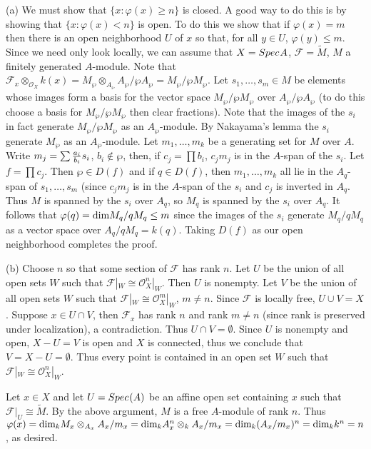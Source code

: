 \documentclass[12pt]{article}
\newcommand{\sox}{\mathcal{O}_X}
\renewcommand{\sf}{\mathcal{F}}
\newcommand{\tensor}{\otimes}
\newcommand{\isom}{\cong}
\renewcommand{\dim}{\mbox{\rm dim}}
\renewcommand{\phi}{\varphi}
\newcommand{\spec}{Spec \hspace{.01in}}
\begin{document}
(a) We must show that $\{x:\phi(x)\geq n\}$ is closed.
A good way to do this is by showing that 
$\{x:\phi(x)<n\}$ is open. To do this we show that
if $\phi(x)=m$ then there is an open neighborhood $U$ of
$x$ so that, for all $y\in U$, $\phi(y)\leq m$. 
Since we need only look locally, we can assume that
$X=\spec A$, $\sf=\tilde{M}$, $M$ a finitely generated
$A$-module. Note that $\sf_x\tensor_{\sox}k(x)=
M_{\wp}\tensor_{A_{\wp}}A_{\wp}/{\wp A_{\wp}}=
M_{\wp}/{\wp M_\wp}$.   
Let $s_1,\ldots,s_m\in M$ be elements whose images
form a basis for the vector space $M_{\wp}/\wp M_{\wp}$
over $A_{\wp}/\wp A_{\wp}$ (to do this choose a basis
for $M_{\wp}/\wp M_{\wp}$ then clear fractions). Note
that the images of the $s_i$ in fact generate
$M_{\wp}/{\wp M_{\wp}}$ as an $A_{\wp}$-module. 
By Nakayama's lemma the $s_i$ generate 
$M_{\wp}$ as an $A_{\wp}$-module. 
Let $m_1,\ldots,m_k$ be a generating set for
$M$ over $A$. Write $m_j=\sum {a_i\over b_i}s_i$,
$b_i\not\in\wp$, then, if $c_j=\prod b_i$, 
$c_jm_j$ is in the $A$-span of the $s_i$. Let
$f=\prod c_j$. Then $\wp\in D(f)$ and if 
$q\in D(f)$, then $m_1,\ldots,m_k$ all lie
in the $A_q$-span of $s_1,\ldots,s_m$ (since
$c_jm_j$ is in the $A$-span of the $s_i$
and $c_j$ is inverted in $A_q$. Thus $M$ is spanned
by the $s_i$ over $A_q$, so $M_q$ is spanned by
the $s_i$ over $A_q$. It follows that 
$\phi(q)=\dim M_q/qM_q\leq m$ since the images
of the $s_i$ generate $M_q/qM_q$ as a vector
space over $A_q/qM_q=k(q)$. Taking $D(f)$ as
our open neighborhood completes the proof.

(b) Choose $n$ so that some section of $\sf$ 
has rank $n$. Let $U$ be the union of all open sets $W$
such that $\sf|_W\isom\sox^n|_W$. Then $U$ is nonempty.
Let $V$ be the
union of all open sets $W$ such that
$\sf|_W\isom\sox^m|_W$, $m\not=n$. Since $\sf$ is
locally free, $U\cup V=X$. Suppose $x\in U\cap V$, 
then $\sf_x$ has rank $n$ and rank $m\not=n$ (since
rank is preserved under localization), a 
contradiction. Thus $U\cap V=\emptyset$. Since $U$
is nonempty and open, $X-U=V$ is open and $X$ is 
connected, thus we conclude that $V=X-U=\emptyset$. Thus
every point is contained in an open set $W$ such
that $\sf|_W\isom\sox^n|_W$. 

Let $x\in X$ and let $U=\spec(A)$ be an affine open set
containing $x$ such that $\sf|_U\isom\tilde{M}$. By the above
argument, $M$ is a free $A$-module of rank $n$. 
Thus $\phi(x)=\dim_k M_x\tensor_{A_x}A_x/m_x
=\dim_k A_x^n\tensor_k A_x/m_x=\dim_k (A_x/m_x)^n
=\dim_k k^n=n$, as desired.   
\end{document}
